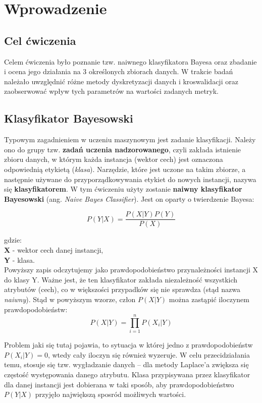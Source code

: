 \section{Wprowadzenie}
    \subsection{Cel ćwiczenia}
        Celem ćwiczenia było poznanie tzw. naiwnego klasyfikatora Bayesa oraz zbadanie i ocena jego
        działania na 3 określonych zbiorach danych. W trakcie badań należało uwzględnić różne metody
        dyskretyzacji danych i kroswalidacji oraz zaobserwować wpływ tych parametrów na wartości
        zadanych metryk.

    \subsection{Klasyfikator Bayesowski}
        Typowym zagadnieniem w uczeniu maszynowym jest zadanie klasyfikacji. Należy ono do grupy
        tzw. \textbf{zadań uczenia nadzorowanego}, czyli zakłada istnienie zbioru danych, w którym każda
        instancja (wektor cech) jest oznaczona odpowiednią etykietą (\textit{klasa}). Narzędzie, które
        jest uczone na takim zbiorze, a następnie używane do przyporządkowywania etykiet do nowych
        instancji, nazywa się \textbf{klasyfikatorem}. W tym ćwiczeniu użyty zostanie \textbf{naiwny klasyfikator
        Bayesowski} (ang. \textit{Naive Bayes Classifier}). Jest on oparty o twierdzenie Bayesa:

        $$ P(Y | X ) = \frac{P(X|Y)P(Y)}{P(X)}$$

        \noindent gdzie: \\
        \textbf{X} - wektor cech danej instancji, \\
        \textbf{Y} - klasa.\\

        \noindent Powyższy zapis odczytujemy jako prawdopodobieństwo przynależności instancji X do klasy Y.
        Ważne jest, że ten klasyfikator zakłada niezależność wszystkich atrybutów (cech), co w większości przypadków
        się nie sprawdza (stąd nazwa \textit{naiwny}). Stąd w powyższym wzorze, człon $P(X|Y)$ można zastąpić iloczynem
        prawdopodobieństw:
            $$ P(X|Y) = \prod_{i= 1}^{n}P(X_i|Y)$$

        \noindent Problem jaki się tutaj pojawia, to sytuacja w której jedno z prawdopodobieństw $P(X_i|Y) = 0$, wtedy cały
        iloczyn się również wyzeruje. W celu przecidziałania temu, stosuje się tzw. wygładzanie danych -- dla metody Laplace'a
        zwiększa się częstość występowania danego atrybutu. Klasa przypisywana przez klasyfikator dla danej instancji jest
        dobierana w taki sposób, aby prawdopodobieństwo $P(Y|X)$ przyjęło największą sposród możliwych wartości.
        \vspace{1em}

